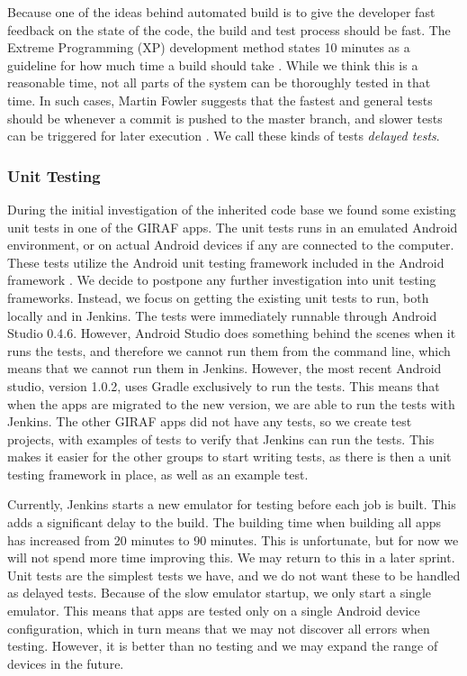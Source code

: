 Because one of the ideas behind automated build is to give the developer fast feedback on the state of the code, the build and test process should be fast. The Extreme Programming (XP) development method states 10 minutes as a guideline for how much time a build should take \parencite{beck2004}. While we think this is a reasonable time, not all parts of the system can be thoroughly tested in that time. In such cases, Martin Fowler suggests that the fastest and general tests should be whenever a commit is pushed to the master branch, and slower tests can be triggered for later execution \parencite{fowlerCI}. We call these kinds of tests \emph{delayed tests}.

\subsubsection{Unit Testing}
During the initial investigation of the inherited code base we found some existing unit tests in one of the GIRAF apps. The unit tests runs in an emulated Android environment, or on actual Android devices if any are connected to the computer. These tests utilize the Android unit testing framework included in the Android framework \parencite{AndroidUnit}. We decide to postpone any further investigation into unit testing frameworks. Instead, we focus on getting the existing unit tests to run, both locally and in Jenkins. The tests were immediately runnable through Android Studio 0.4.6. However, Android Studio does something behind the scenes when it runs the tests, and therefore we cannot run them from the command line, which means that we cannot run them in Jenkins. However, the most recent Android studio, version 1.0.2, uses Gradle exclusively to run the tests. This means that when the apps are migrated to the new version, we are able to run the tests with Jenkins. The other GIRAF apps did not have any tests, so we create test projects, with examples of tests to verify that Jenkins can run the tests. This makes it easier for the other groups to start writing tests, as there is then a unit testing framework in place, as well as an example test.

Currently, Jenkins starts a new emulator for testing before each job is built. This adds a significant delay to the build. The building time when building all apps has increased from 20 minutes to 90 minutes. This is unfortunate, but for now we will not spend more time improving this. We may return to this in a later sprint. Unit tests are the simplest tests we have, and we do not want these to be handled as delayed tests. Because of the slow emulator startup, we only start a single emulator. This means that apps are tested only on a single Android device configuration, which in turn means that we may not discover all errors when testing. However, it is better than no testing and we may expand the range of devices in the future.

